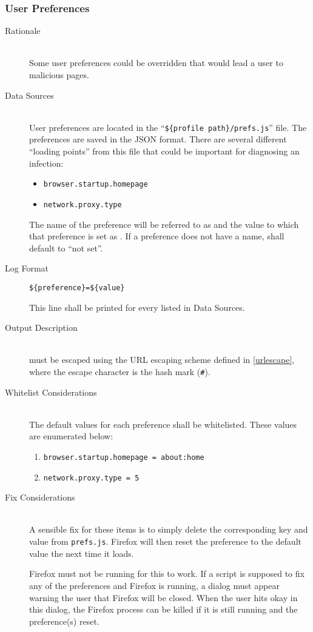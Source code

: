\subsubsection{User Preferences}
\begin{description}
\item[Rationale] \hfill \\
Some user preferences could be overridden that would lead a user to malicious
pages.  
\item[Data Sources] \hfill \\
User preferences are located in the ``\verb|${profile path}/prefs.js|'' file. 
The preferences are saved in the JSON format. There are several different
``loading points'' from this file that could be important for diagnosing an
infection:
\begin{itemize}
  \item \verb|browser.startup.homepage|
  \item \verb|network.proxy.type|
\end{itemize}
The name of the preference will be referred to as  and the
value to which that preference is set as .  If a preference does not
have a name,  shall default to ``not set''.
\item[Log Format] \hfill 
\vspace{-\baselineskip}
\begin{verbatim}
${preference}=${value}
\end{verbatim}
This line shall be printed for every  listed in Data Sources.
\item[Output Description] \hfill \\
 must be escaped using the URL escaping scheme defined in
\ref{urlescape}, where the escape character is the hash mark (\verb|#|).
\item[Whitelist Considerations] \hfill \\
The default values for each preference shall be whitelisted.  These values are
enumerated below:
\begin{enumerate}
  \item \verb|browser.startup.homepage = about:home|
  \item \verb|network.proxy.type = 5|
\end{enumerate}

\item[Fix Considerations] \hfill \\
A sensible fix for these items is to simply delete the corresponding key and
value from \verb|prefs.js|.  Firefox will then reset the preference to the
default value the next time it loads.

Firefox must not be running for this to work.  If a script is supposed to fix
any of the preferences and Firefox is running, a dialog must appear warning the
user that Firefox will be closed.  When the user hits okay in this dialog, the
Firefox process can be killed if it is still running and the preference(s)
reset.
\end{description}

